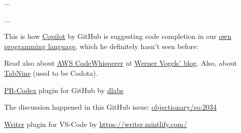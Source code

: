 \documentclass{article}
\begin{document}

...

\plush{}


...

\plush{}



This is how \href{https://github.com/features/copilot}{Copilot} by GitHub is suggesting code completion in our \href{https://www.eolang.org}{own programming language}, which he definitely hasn't seen before:

\begin{multicols}{4}
\end{multicols}

Read also about \href{https://aws.amazon.com/codewhisperer/}{AWS CodeWhisperer} at \href{https://www.allthingsdistributed.com/2023/04/how-ai-coding-companions-will-change-the-way-developers-work.html}{Werner Vogels' blog}. Also, about \href{https://github.com/codota}{TabNine} (used to be Codota).

\plush{}



\href{https://github.com/decentralizedlabs/pr-codex}{PR-Codex} plugin for GitHub by \href{https://www.dlabs.app/}{dlabs}

\plush{}



The discussion happened in this GitHub issue: \href{https://github.com/objectionary/eo/pull/2034}{objectionary/eo:2034}

\plush{}



\plush{}



\href{https://github.com/mintlify/writer}{Writer} plugin for VS-Code by \href{Mintlify}{https://writer.mintlify.com/}
\end{document}
